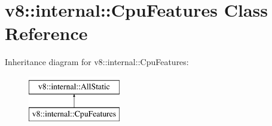 \hypertarget{classv8_1_1internal_1_1CpuFeatures}{}\section{v8\+:\+:internal\+:\+:Cpu\+Features Class Reference}
\label{classv8_1_1internal_1_1CpuFeatures}
Inheritance diagram for v8\+:\+:internal\+:\+:Cpu\+Features\+:\begin{figure}[H]
\begin{center}
\leavevmode
\includegraphics[height=2.000000cm]{classv8_1_1internal_1_1CpuFeatures}
\end{center}
\end{figure}
